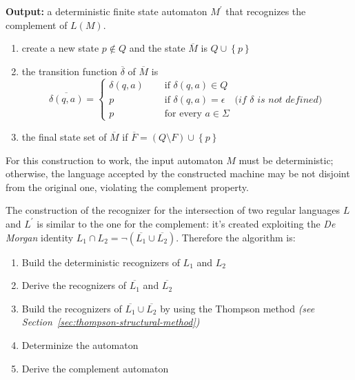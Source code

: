 \documentclass[english]{article}
\begin{document}
\textbf{Output:}
a deterministic finite state automaton \(M^\prime\) that recognizes the complement of \(L(M)\).

\begin{enumerate}
  \item create a new state \(p \notin Q\) and the state \(\overline{M}\) is \(Q \cup \left\{ p \right\}\)
  \item the transition function \(\overline{\delta}\) of \(\overline{M}\) is
        \[\overline{\delta(q, a)} = \begin{cases}
            \delta(q, a) \quad & \text{ if } \delta(q, a)\in Q                                                             \\
            p \quad            & \text{ if } \delta(q, a) = \epsilon \quad \textit{(if }  \delta \textit{ is not defined)} \\
            p \quad            & \text{ for every } a \in \Sigma
          \end{cases}\]
  \item the final state set of \(\overline{M}\) if \(\overline{F} = \left( Q \setminus F \right) \cup \left\{ p \right\}\)
\end{enumerate}

For this construction to work, the input automaton \(M\) must be deterministic;
otherwise, the language accepted by the constructed machine may be not disjoint from the original one, violating the complement property.

\bigskip
The construction of the recognizer for the intersection of two regular languages \(L\) and \(L^\prime\) is similar to the one for the complement:
it's created exploiting the \textit{De Morgan} identity \(L_1 \cap L_2 = \lnot (\overline{L_1} \cup \overline{L_2})\).
Therefore the algorithm is:

\begin{enumerate}
  \item Build the deterministic recognizers of \(L_1\) and \(L_2\)
  \item Derive the recognizers of \(\overline{L_1}\) and \(\overline{L_2}\)
  \item Build the recognizers of \(\overline{L_1} \cup \overline{L_2}\) by using the Thompson method \textit{(see Section~\ref{sec:thompson-structural-method})}
  \item Determinize the automaton
  \item Derive the complement automaton
\end{enumerate}
\end{document}
